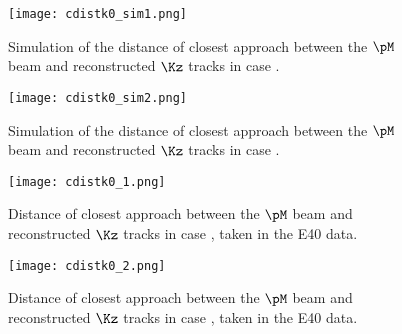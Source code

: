 \begin{figure}[!h]
  \begin{minipage}[t]{0.48\columnwidth}
    \centering
    \texttt{[image: cdistk0\_sim1.png]}
    \caption{Simulation of the distance of closest approach between the $\pM$ beam and reconstructed $\Kz$ tracks in case .}
    \label{fig-cdistk0_sim1}
  \end{minipage}
  \hspace{0.04\columnwidth} %
  \begin{minipage}[t]{0.48\columnwidth}
    \centering
    \texttt{[image: cdistk0\_sim2.png]}
    \caption{Simulation of the distance of closest approach between the $\pM$ beam and reconstructed $\Kz$ tracks in case .}
    \label{fig-cdistk0_sim2}
  \end{minipage}
\end{figure}

\begin{figure}[!h]
  \begin{minipage}[t]{0.48\columnwidth}
    \centering
    \texttt{[image: cdistk0\_1.png]}
    \caption{Distance of closest approach between the $\pM$ beam and reconstructed $\Kz$ tracks in case , taken in the E40 data.}
    \label{fig-cdistk0_1}
  \end{minipage}
  \hspace{0.04\columnwidth} %
  \begin{minipage}[t]{0.48\columnwidth}
    \centering
    \texttt{[image: cdistk0\_2.png]}
    \caption{Distance of closest approach between the $\pM$ beam and reconstructed $\Kz$ tracks in case , taken in the E40 data.}
    \label{fig-cdistk0_2}
  \end{minipage}
\end{figure}



